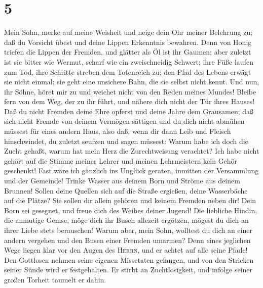 \hypertarget{section-4}{%
\section{5}\label{section-4}}

 Mein Sohn, merke auf meine Weisheit und neige dein Ohr
meiner Belehrung zu;  daß du Vorsicht übest und deine
Lippen Erkenntnis bewahren.  Denn von Honig triefen die
Lippen der Fremden, und glätter als Öl ist ihr Gaumen; 
aber zuletzt ist sie bitter wie Wermut, scharf wie ein zweischneidig
Schwert;  ihre Füße laufen zum Tod, ihre Schritte streben
dem Totenreich zu;  den Pfad des Lebens erwägt sie nicht
einmal; sie geht eine unsichere Bahn, die sie selbst nicht kennt.
 Und nun, ihr Söhne, höret mir zu und weichet nicht von
den Reden meines Mundes!  Bleibe fern von dem Weg, der zu
ihr führt, und nähere dich nicht der Tür ihres Hauses! 
Daß du nicht Fremden deine Ehre opferst und deine Jahre dem Grausamen;
 daß sich nicht Fremde von deinem Vermögen sättigen und
du dich nicht abmühen müssest für eines andern Haus, 
also daß, wenn dir dann Leib und Fleisch hinschwindet, du zuletzt
seufzen und sagen müssest:  Warum habe ich doch die Zucht
gehaßt, warum hat mein Herz die Zurechtweisung verachtet?
 Ich habe nicht gehört auf die Stimme meiner Lehrer und
meinen Lehrmeistern kein Gehör geschenkt!  Fast wäre ich
gänzlich ins Unglück geraten, inmitten der Versammlung und der Gemeinde!
 Trinke Wasser aus deinem Born und Ströme aus deinem
Brunnen!  Sollen deine Quellen sich auf die Straße
ergießen, deine Wasserbäche auf die Plätze?  Sie sollen
dir allein gehören und keinem Fremden neben dir!  Dein
Born sei gesegnet, und freue dich des Weibes deiner Jugend!
 Die liebliche Hindin, die anmutige Gemse, möge dich ihr
Busen allezeit ergötzen, mögest du dich an ihrer Liebe stets berauschen!
 Warum aber, mein Sohn, wolltest du dich an einer andern
vergehen und den Busen einer Fremden umarmen?  Denn eines
jeglichen Wege liegen klar vor den Augen des \textsc{Herrn}, und er
achtet auf alle seine Pfade!  Den Gottlosen nehmen seine
eigenen Missetaten gefangen, und von den Stricken seiner Sünde wird er
festgehalten.  Er stirbt an Zuchtlosigkeit, und infolge
seiner großen Torheit taumelt er dahin.

